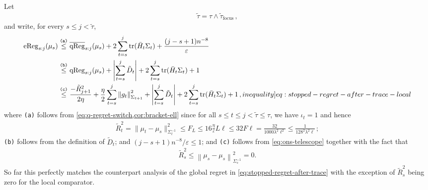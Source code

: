 \documentclass[12pt,cleveref]{jmlr}
\newcommand{\ineqlabel}[1]{\label[inequality]{#1}}
\newcommand{\reason}[1]{\texttt{(#1)}}
\newcommand{\explan}[2]{\stackrel{\reason{#2}}{#1}}
\newcommand{\tr}{\operatorname{tr}}
\newcommand{\1}{\mathbf 1}
\newcommand{\eps}{\varepsilon}
\newcommand{\normm}[2]{\left\lVert #1\right\rVert_{#2}}
\begin{document}
Let
\begin{align}
    \tilde{\tau} = \tau \wedge \tilde{\tau}_{\mathrm{focus}}\,,
\end{align}
and write, for every $s\leq j<\tilde{\tau}$,
\begin{align}
    \operatorname{eReg}_{s:j}(\mu_s)
    &
    \explan{\leq}{a}
    \overline{\operatorname{qReg}}_{s:j}(\mu_s)
    +
    2\sum_{t=s}^{j}
    \tr(\bar{H}_t\Sigma_t)
    +\frac{(j-s+1)n^{-8}}{\eps}
    \\
    &
    \explan{\leq}{b}
    \operatorname{qReg}_{s:j}(\mu_s)
    +
    \left|
    \sum_{t=s}^{j} \tilde{D}_t
    \right|
    +
    2\sum_{t=s}^{j}
    \tr(\bar{H}_t\Sigma_t)
    +1
    \\
    &
    \explan{\leq}{c}
    \frac{- \tilde{R}_{j+1}^2}{2\eta}
    +
    \frac{\eta}{2}
    \sum_{t=s}^{j}\normm{g_t}{\Sigma_{t+1}}^2
    +
    \left|
    \sum_{t=s}^{j} \tilde{D}_t
    \right|
    +
    2\sum_{t=s}^{j}
    \tr(\bar{H}_t\Sigma_t)
    +1\,,
    \ineqlabel{eq:stopped-regret-after-trace-local}
\end{align}
where \reason{a} follows from \cref{eq:q-regret-switch,cor:bracket-ell}
since for all $s\leq t \leq j<\tilde{\tau}\leq\tau$, we have $\iota_t = 1$ and hence
\begin{align}
    \tilde{R}_t^2 = \|\mu_t - \mu_s\|_{\Sigma_t^{-1}}^2 \leq F_L
    \leq
    16 \frac{\eta}{\eps} L \ell
    \leq
    32F\ell
    =\frac{32}{1000\lambda^2\ell^2}
    \leq\frac{1}{128^2\lambda^2\ell}\,;
\end{align}
\reason{b} follows from the definition of $\tilde{D}_t$; and
$(j-s+1)n^{-8}/\eps\leq1$; and \reason{c} follows from
\cref{eq:ons-telescope} together with the fact that
\begin{align}
    \tilde{R}_s^2 \leq \normm{\mu_s-\mu_s}{\Sigma_s^{-1}}^2 = 0.
\end{align}
So far this perfectly matches the counterpart analysis of the global regret in \cref{eq:stopped-regret-after-trace} with the exception of $\tilde{R}_s^2$ being zero for the local comparator.
\end{document}
